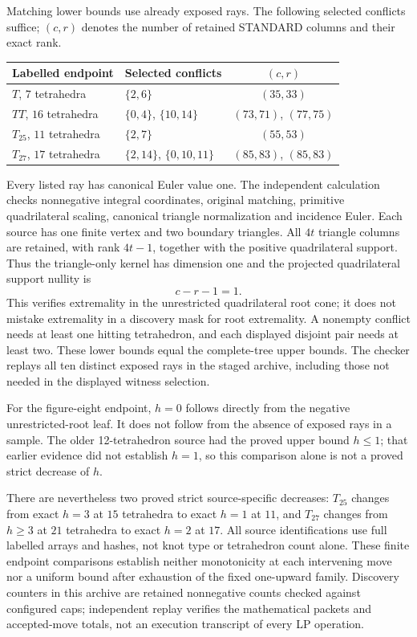 Matching lower bounds use already exposed rays.  The following selected
conflicts suffice; $(c,r)$ denotes the number of retained STANDARD
columns and their exact rank.
\begin{center}
\begin{tabular}{llc}
\hline
Labelled endpoint & Selected conflicts & $(c,r)$\\
\hline
$T$, $7$ tetrahedra & $\{2,6\}$ & $(35,33)$\\
$TT$, $16$ tetrahedra & $\{0,4\}$, $\{10,14\}$
                                      & $(73,71)$, $(77,75)$\\
$T_{25}$, $11$ tetrahedra & $\{2,7\}$ & $(55,53)$\\
$T_{27}$, $17$ tetrahedra & $\{2,14\}$, $\{0,10,11\}$
                                      & $(85,83)$, $(85,83)$\\
\hline
\end{tabular}
\end{center}
Every listed ray has canonical Euler value one.  The independent
calculation checks nonnegative integral coordinates, original matching,
primitive quadrilateral scaling, canonical triangle normalization and
incidence Euler.  Each source has one finite vertex and two boundary
triangles.  All $4t$ triangle columns are retained, with rank
$4t-1$, together with the positive quadrilateral support.  Thus the
triangle-only kernel has dimension one and the projected quadrilateral
support nullity is
\[
                             c-r-1=1.
\]
This verifies extremality in the unrestricted quadrilateral root cone;
it does not mistake extremality in a discovery mask for root extremality.
A nonempty conflict needs at least one hitting tetrahedron, and each
displayed disjoint pair needs at least two.  These lower bounds equal
the complete-tree upper bounds.  The checker replays all ten distinct
exposed rays in the staged archive, including those not needed in the
displayed witness selection.

For the figure-eight endpoint, $h=0$ follows directly from the negative
unrestricted-root leaf.  It does not follow from the absence of exposed
rays in a sample.  The older 12-tetrahedron source had the proved upper
bound $h\le1$; that earlier evidence did not establish $h=1$, so this
comparison alone is not a proved strict decrease of $h$.

There are nevertheless two proved strict source-specific decreases:
$T_{25}$ changes from exact $h=3$ at $15$ tetrahedra to exact $h=1$ at
$11$, and $T_{27}$ changes from $h\ge3$ at $21$ tetrahedra to exact
$h=2$ at $17$.  All source identifications use full labelled arrays
and hashes, not knot type or tetrahedron count alone.  These finite
endpoint comparisons establish neither monotonicity at each intervening
move nor a uniform bound after exhaustion of the fixed one-upward
family.  Discovery counters in this archive are retained nonnegative
counts checked against configured caps; independent replay verifies
the mathematical packets and accepted-move totals, not an execution
transcript of every LP operation.

